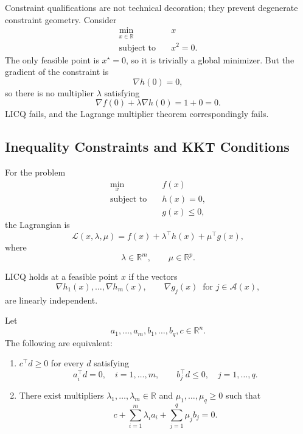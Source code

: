 \begin{remark}
	Constraint qualifications are not technical decoration; they prevent degenerate constraint geometry. Consider
	\begin{align*}
		\min_{x \in \mathbb{R}} \quad & x \\
		\text{subject to}\quad & x^2=0.
	\end{align*}
	The only feasible point is $x^\star=0$, so it is trivially a global minimizer. But the gradient of the constraint is
	\[
		\nabla h(0)=0,
	\]
	so there is no multiplier $\lambda$ satisfying
	\[
		\nabla f(0)+\lambda \nabla h(0)=1+0=0.
	\]
	LICQ fails, and the Lagrange multiplier theorem correspondingly fails.
\end{remark}

\subsection{Inequality Constraints and KKT Conditions}
\label{sec:l3-inequality-constraints-and-kkt-conditions}

\begin{definition}\label{def:l3-lagrangian-for-mixed-equality-and-inequality-constraints}
	For the problem
	\begin{align*}
		\min_x \quad & f(x) \\
		\text{subject to}\quad & h(x)=0, \\
		                       & g(x)\le 0,
	\end{align*}
	the Lagrangian is
	\[
		\mathcal{L}(x,\lambda,\mu)=f(x)+\lambda^\top h(x)+\mu^\top g(x),
	\]
	where
	\[
		\lambda \in \mathbb{R}^m,
		\qquad
		\mu \in \mathbb{R}^p.
	\]
\end{definition}

\begin{definition}\label{def:l3-licq-for-mixed-constraints}
	LICQ holds at a feasible point $x$ if the vectors
	\[
		\nabla h_1(x),\dots,\nabla h_m(x),
		\qquad
		\nabla g_j(x)\;\; \text{for } j \in \mathcal{A}(x),
	\]
	are linearly independent.
\end{definition}

\begin{lemma}\label{lem:l3-linearized-alternative-for-constrained-stationarity}
	Let
	\[
		a_1,\dots,a_m,b_1,\dots,b_q,c \in \mathbb{R}^n.
	\]
	The following are equivalent:
	\begin{enumerate}[label=(\roman*)]
		\item $c^\top d \ge 0$ for every $d$ satisfying
		      \[
			      a_i^\top d = 0,\quad i=1,\dots,m,
			      \qquad
			      b_j^\top d \le 0,\quad j=1,\dots,q.
		      \]
		\item There exist multipliers $\lambda_1,\dots,\lambda_m \in \mathbb{R}$ and $\mu_1,\dots,\mu_q \ge 0$ such that
		      \[
			      c+\sum_{i=1}^m \lambda_i a_i + \sum_{j=1}^q \mu_j b_j = 0.
		      \]
	\end{enumerate}
\end{lemma}

